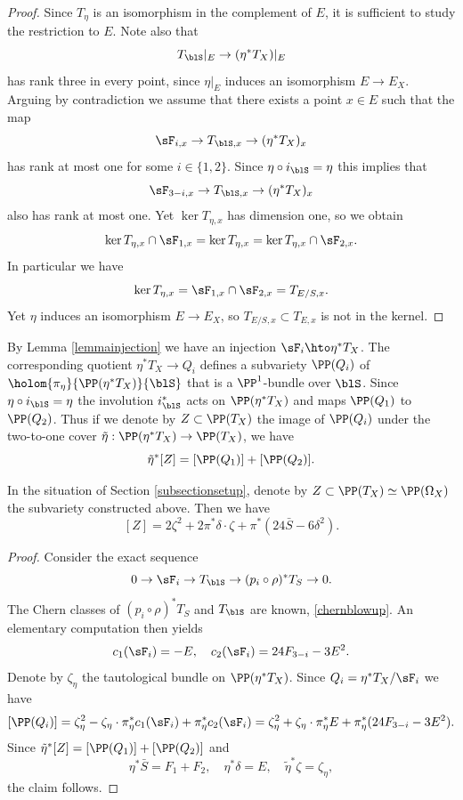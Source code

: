\begin{proof}
Since $T_\eta$ is an isomorphism in the complement of $E$, it is sufficient to study the restriction to $E$.
Note also that
\[
T_{\blS}|_E \to (\eta^* T_X)|_E
\]
has rank three in every point, since $\eta|_E$ induces an isomorphism $E \to E_X$.
Arguing by contradiction we assume that there exists a point $x \in E$ such that the map
\[
\sF_{i,x} \to T_{\blS,x} \to (\eta^* T_X)_x
\]
has rank at most one for some $i \in \{1, 2 \}$. Since $\eta \circ i_{\blS} = \eta$ this implies that
\[
\sF_{3-i,x} \to T_{\blS,x} \to (\eta^* T_X)_x
\]
also has rank at most one. Yet $\ker T_{\eta,x}$ has dimension one, so we obtain
\[
\ker T_{\eta,x} \cap \sF_{1,x} = \ker T_{\eta,x} = \ker T_{\eta,x} \cap \sF_{2,x}.
\]
In particular we have
\[
\ker T_{\eta,x} = \sF_{1,x} \cap \sF_{2,x}= T_{E/S,x}.
\]
Yet $\eta$ induces an isomorphism $E \to E_X$, so $T_{E/S,x} \subset T_{E,x}$ is not in the kernel.
\end{proof}

By Lemma \ref{lemmainjection} we have an injection $\sF_i \hto \eta^* T_X$. The corresponding quotient
$\eta^* T_X \to Q_i$ defines a subvariety $\PP(Q_i)$ of $\holom{\pi_\eta}{\PP(\eta^* T_X)}{\blS}$
that is a $\PP^1$-bundle over $\blS$.
Since $\eta \circ i_{\blS} = \eta$ the involution $i_{\blS}^*$ acts on $\PP(\eta^* T_X)$ and maps
$\PP(Q_1)$ to $\PP(Q_2)$. Thus if we denote by $Z \subset \PP(T_X)$ the image of $\PP(Q_i)$ under
the two-to-one cover $\tilde \eta: \PP(\eta^* T_X) \to \PP(T_X)$, we have
\[
\tilde \eta^* [Z] = [\PP(Q_1)] + [\PP(Q_2)].
\]
\begin{proposition}
In the situation of Section \ref{subsectionsetup}, denote by $Z \subset \PP(T_X) \simeq \PP(\Omega_X)$ the subvariety constructed above. Then we have
\begin{equation} \label{classZ}
[Z] = 2 \zeta^2 + 2 \pi^* \delta \cdot \zeta + \pi^* (24 \bar S-6 \delta^2).
\end{equation}
\end{proposition}

\begin{proof}
Consider the exact sequence
\[
0 \to \sF_i \to T_{\blS} \to (p_i \circ \rho)^* T_S \to 0.
\]
The Chern classes of $(p_i \circ \rho)^* T_S$ and $T_{\blS}$ are known, \cf \eqref{chernblowup}.
An elementary computation then yields
\begin{equation} \label{chernFi}
c_1(\sF_i)=-E, \quad c_2(\sF_i) = 24 F_{3-i} - 3 E^2.
\end{equation}
Denote by $\zeta_\eta$ the tautological bundle on $\PP(\eta^* T_X)$.
Since $Q_i = \eta^* T_X/\sF_i$ we have
\[
[\PP(Q_i)] = \zeta_\eta^2 - \zeta_\eta \cdot \pi_\eta^* c_1(\sF_i) + \pi_\eta^* c_2(\sF_i)
=
\zeta_\eta^2 + \zeta_\eta \cdot \pi_\eta^* E + \pi_\eta^* (24 F_{3-i} - 3 E^2).
\]
Since $\tilde \eta^* [Z] = [\PP(Q_1)] + [\PP(Q_2)]$ and
\[
\eta^* \bar S = F_1+F_2, \quad \eta^* \delta = E, \quad \tilde \eta^* \zeta = \zeta_\eta,
\]
the claim follows.
\end{proof}

